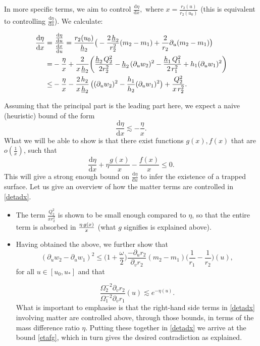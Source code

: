 \documentclass{article}[11pt]
\newcommand{\hsp}{\hspace{.5mm}}
\newcommand{\hba}{\underline{h}}
\newcommand{\be}{\begin{equation}}
\newcommand{\ee}{\end{equation}}
\numberwithin{equation}{section}
\begin{document}
\vspace{3mm}

\noindent In more specific terms, we aim to control $\frac{\text{d}\eta}{\text{d}x},$ where $x= \frac{r_2(u)}{r_2(u_0)}$ (this is equivalent to controlling $\frac{\text{d}\eta}{\text{d}u}$). We calculate:

\begin{align} \label{detadx} \frac{\text{d}\eta}{\text{d}x} =& \hsp \hsp \frac{\frac{\text{d}\eta}{\text{d}u}}{\frac{\text{d}x}{\text{d}u}}= \frac{r_2(u_0)}{\hba_2}\big(-\frac{2\hsp \hba_2}{r_2^2}(m_2-m_1) + \frac{2}{r_2}\partial_u (m_2-m_1)\big) \notag \\ =& -\frac{\eta}{x}+\frac{2}{x \hsp \hba_2} \bigg(\frac{\hba_2 \hsp Q_2^2}{2r_2^2}-\hba_2\hsp (\partial_u w_2)^2 - \frac{\hba_1 \hsp Q_1^2}{2\hsp r_1^2}+h_1(\partial_u w_1)^2\bigg) \notag \\ \leq& -\frac{\eta}{x}-\frac{2\hsp h_2}{x \hsp \hba_2}\hsp \big((\partial_u w_2)^2 - \frac{h_1}{h_2}(\partial_u w_1)^2\big) + \frac{Q_2^2}{x\hsp r_2^2}. \end{align} 

Assuming that the principal part is the leading part here, we expect a naive (heuristic) bound of the form \[ \frac{\text{d}\eta}{\text{d}x}\lesssim -\frac{\eta}{x}.    \]What we will be able to show is that there exist functions $g(x),f(x)$ that are $o(\frac{1}{x})$, such that \be \label{etafg}  \frac{\text{d}\eta}{\text{d}x}+\eta \frac{g(x)}{x}-\frac{f(x)}{x}\leq 0.    \ee This will give a strong enough bound on $\frac{\text{d}\eta}{\text{d}u}$ to infer the existence of a trapped surface. Let us give an overview of how the matter terms are controlled in \eqref{detadx}.

\begin{itemize}
\item The term $\frac{Q_2^2}{x r_2^2}$ is shown to be small enough compared to $\eta$, so that the entire term is absorbed in $\frac{\eta \hsp  g(x)}{x}$ (what $g$ signifies is explained above). 

\item Having obtained the above, we further show that \[(\partial_u w_2 - \partial_u w_1)^2 \leq \big(1 +\frac{\omega}{2}\big) \frac{- \partial_u r_2}{\partial_v r_2}(m_2-m_1)\bigg( \frac{1}{r_1}- \frac{1}{r_2}\bigg)(u),    \]for all $u \in [u_0, u_*]$ and that 

\[  \frac{\Omega_2^{-2}\partial_v r_2}{\Omega_1^{-2}\partial_v r_1}(u) \lesssim e^{-\eta(u)}.   \]What is important to emphasise is that the right-hand side terms in \eqref{detadx} involving matter are controlled above, through those bounds, in terms of the mass difference ratio $\eta$. Putting these together in \eqref{detadx} we arrive at the bound \eqref{etafg}, which in turn gives the desired contradiction as explained.
\end{itemize}
\end{document}
